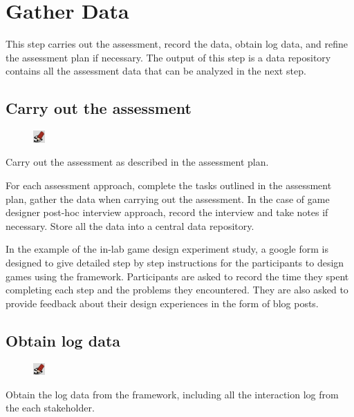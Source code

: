 \documentclass[11pt,oneside]{book}
\begin{document}
\chapter{Gather Data}
This step carries out the assessment, record the data, obtain log data, and refine the assessment plan if necessary. 
The output of this step is a data repository contains all the assessment data that can be analyzed in the next step.

\section{Carry out the assessment}
\begin{shadebox}
\begin{figure}
\vspace{-15pt}\hspace{-10pt}
    \includegraphics[width=0.04\textwidth]{note-icon}
\end{figure}
Carry out the assessment as described in the assessment plan.
\end{shadebox}

For each assessment approach, complete the tasks outlined in the assessment plan, gather the data when carrying out the 
assessment. In the case of game designer post-hoc interview approach, record the interview and take notes if necessary. 
Store all the data into a central data repository. 

In the example of the in-lab game design experiment study, a google form is designed to give detailed step by step 
instructions for the participants to design games using the framework. Participants are asked to record the time they spent completing 
each step and the problems they encountered. They are also asked to provide feedback about their design experiences
in the form of blog posts. 

\section{Obtain log data}
\begin{shadebox}
\begin{figure}
\vspace{-15pt}\hspace{-10pt}
    \includegraphics[width=0.04\textwidth]{note-icon}
\end{figure}
Obtain the log data from the framework, including all the interaction log from the each stakeholder.
\end{shadebox}
\end{document}
